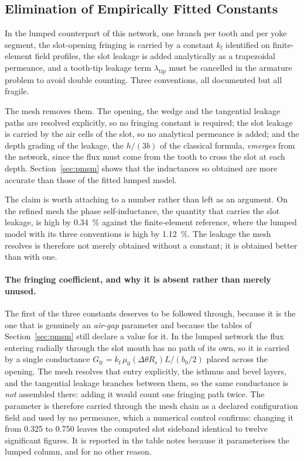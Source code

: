 \documentclass[10pt,a4paper,twocolumn]{article}
\theoremstyle{plain}
\theoremstyle{remark}
\begin{document}
\subsection{Elimination of Empirically Fitted Constants}
\label{sub:fitted}
In the lumped counterpart of this network, one branch per tooth and per
yoke segment, the slot-opening fringing is carried by a constant
$k_{\mathrm{f}}$ identified on finite-element field profiles, the slot
leakage is added analytically as a trapezoidal permeance, and a
tooth-tip leakage term $\lambda_{\mathrm{tip}}$ must be cancelled in the
armature problem to avoid double counting. Three conventions, all
documented but all fragile.

The mesh removes them. The opening, the wedge and the tangential leakage
paths are resolved explicitly, so no fringing constant is required; the
slot leakage is carried by the air cells of the slot, so no analytical
permeance is added; and the depth grading of the leakage, the $h/(3b)$
of the classical formula, \emph{emerges} from the network, since the
flux must come from the tooth to cross the slot at each depth.
Section~\ref{sec:pmsm} shows that the inductances so obtained are more
accurate than those of the fitted lumped model.

The claim is worth attaching to a number rather than left as an
argument. On the refined mesh the phase self-inductance, the quantity
that carries the slot leakage, is high by \SI{0.34}{\percent} against
the finite-element reference, where the lumped model with its three
conventions is high by \SI{1.12}{\percent}. The leakage the mesh
resolves is therefore not merely obtained without a constant; it is
obtained better than with one.

\paragraph{The fringing coefficient, and why it is absent rather than
merely unused.}
The first of the three constants deserves to be followed through,
because it is the one that is genuinely an \emph{air-gap} parameter and
because the tables of Section~\ref{sec:pmsm} still declare a value for
it. In the lumped network the flux entering radially through the slot
mouth has no path of its own, so it is carried by a single conductance
$G_{\mathrm{fr}}=k_{\mathrm{f}}\,\mu_0(\Delta\theta R_{\mathrm{s}})L/(b_0/2)$
placed across the opening. The mesh resolves that entry explicitly, the
isthmus and bevel layers, and the tangential leakage branches between
them, so the same conductance is \emph{not} assembled there: adding it
would count one fringing path twice. The parameter is therefore carried
through the mesh chain as a declared configuration field and used by no
permeance, which a numerical control confirms: changing it from
\num{0.325} to \num{0.750} leaves the computed slot sideband identical
to twelve significant figures. It is reported in the table notes because
it parameterises the lumped column, and for no other reason.
\end{document}
